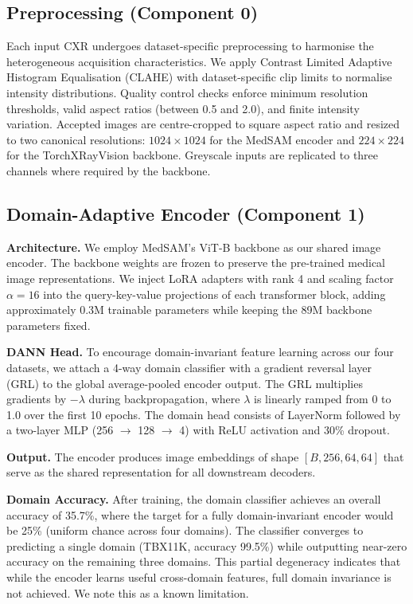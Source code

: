 \documentclass{article}
\begin{document}
\subsection{Preprocessing (Component 0)}

Each input CXR undergoes dataset-specific preprocessing to harmonise the heterogeneous acquisition characteristics. We apply Contrast Limited Adaptive Histogram Equalisation (CLAHE) with dataset-specific clip limits to normalise intensity distributions. Quality control checks enforce minimum resolution thresholds, valid aspect ratios (between 0.5 and 2.0), and finite intensity variation. Accepted images are centre-cropped to square aspect ratio and resized to two canonical resolutions: $1024 \times 1024$ for the MedSAM encoder and $224 \times 224$ for the TorchXRayVision backbone. Greyscale inputs are replicated to three channels where required by the backbone.

\subsection{Domain-Adaptive Encoder (Component 1)}

\textbf{Architecture.} We employ MedSAM's ViT-B backbone \cite{ma2024medsam, kirillov2023sam} as our shared image encoder. The backbone weights are frozen to preserve the pre-trained medical image representations. We inject LoRA adapters \cite{hu2022lora} with rank 4 and scaling factor $\alpha = 16$ into the query-key-value projections of each transformer block, adding approximately 0.3M trainable parameters while keeping the 89M backbone parameters fixed.

\textbf{DANN Head.} To encourage domain-invariant feature learning across our four datasets, we attach a 4-way domain classifier with a gradient reversal layer (GRL) \cite{ganin2016domain} to the global average-pooled encoder output. The GRL multiplies gradients by $-\lambda$ during backpropagation, where $\lambda$ is linearly ramped from 0 to 1.0 over the first 10 epochs. The domain head consists of LayerNorm followed by a two-layer MLP (256 $\rightarrow$ 128 $\rightarrow$ 4) with ReLU activation and 30\% dropout.

\textbf{Output.} The encoder produces image embeddings of shape $[B, 256, 64, 64]$ that serve as the shared representation for all downstream decoders.

\textbf{Domain Accuracy.} After training, the domain classifier achieves an overall accuracy of 35.7\%, where the target for a fully domain-invariant encoder would be 25\% (uniform chance across four domains). The classifier converges to predicting a single domain (TBX11K, accuracy 99.5\%) while outputting near-zero accuracy on the remaining three domains. This partial degeneracy indicates that while the encoder learns useful cross-domain features, full domain invariance is not achieved. We note this as a known limitation.
\end{document}
